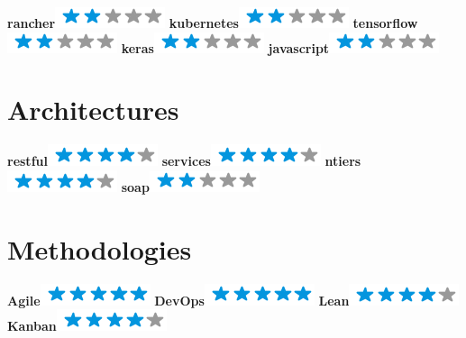 \documentclass[]{friggeri-cv}
\begin{document}
\begin{aside}
        \textbf{rancher}\includegraphics[scale=0.40]{img/2stars.png}
        \textbf{kubernetes}\includegraphics[scale=0.40]{img/2stars.png}
        \textbf{tensorflow}\includegraphics[scale=0.40]{img/2stars.png}
        \textbf{keras}\includegraphics[scale=0.40]{img/2stars.png}
        \textbf{javascript}\includegraphics[scale=0.40]{img/2stars.png}
        ~
    \section{Architectures}
        \textbf{restful}\includegraphics[scale=0.40]{img/4stars.png}
        \textbf{services}\includegraphics[scale=0.40]{img/4stars.png}
        \textbf{ntiers}\includegraphics[scale=0.40]{img/4stars.png}
        \textbf{soap}\includegraphics[scale=0.40]{img/2stars.png}
        ~
    \section{Methodologies}
        \textbf{Agile}\includegraphics[scale=0.40]{img/5stars.png}
        \textbf{DevOps}\includegraphics[scale=0.40]{img/5stars.png}
        \textbf{Lean}\includegraphics[scale=0.40]{img/4stars.png}
        \textbf{Kanban}\includegraphics[scale=0.40]{img/4stars.png}
        ~
\end{aside}
\end{document}
